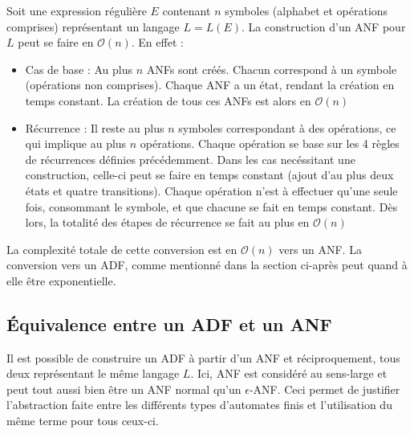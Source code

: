\begin{complexity}
	Soit une expression régulière $E$ contenant $n$ symboles (alphabet et opérations comprises) représentant un langage $L=L(E)$.
  La construction d'un ANF pour $L$ peut se faire en $\mathcal{O}(n)$. En effet :
	\begin{itemize}
		\item Cas de base : Au plus $n$ ANFs sont créés. Chacun correspond à un symbole (opérations non comprises). Chaque ANF a un état, rendant la création en temps constant. La création de tous ces ANFs est alors en $\mathcal{O}(n)$
		\item Récurrence : Il reste au plus $n$ symboles correspondant à des opérations, ce qui implique au plus $n$ opérations. Chaque opération se base sur les 4 règles de récurrences définies précédemment. Dans les cas necéssitant une construction, celle-ci peut se faire en temps constant (ajout d'au plus deux états et quatre transitions). Chaque opération n'est à effectuer qu'une seule fois, consommant le symbole, et que chacune se fait en temps constant. Dès lors, la totalité des étapes de récurrence se fait au plus en $\mathcal{O}(n)$
	\end{itemize}

	La complexité totale de cette conversion est en $\mathcal{O}(n)$ vers un ANF. La conversion vers un ADF, comme mentionné dans la section ci-après peut quand à elle être exponentielle.

\end{complexity}




\subsection{Équivalence entre un ADF et un ANF}\label{adf:anfadf}
Il est possible de construire un ADF à partir d'un ANF et réciproquement, tous deux représentant le même langage $L$. Ici, ANF est considéré au sens-large et peut tout aussi bien être un ANF normal qu'un $\epsilon$-ANF. Ceci permet de justifier l'abstraction faite entre les différents types d'automates finis et l'utilisation du même terme pour tous ceux-ci.

